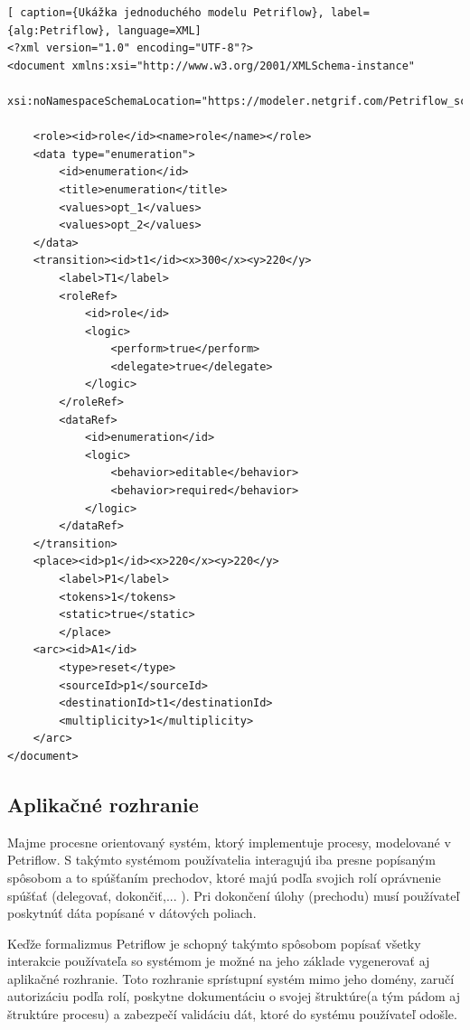 \begin{lstlisting}[ caption={Ukážka jednoduchého modelu Petriflow}, label={alg:Petriflow}, language=XML]
<?xml version="1.0" encoding="UTF-8"?>
<document xmlns:xsi="http://www.w3.org/2001/XMLSchema-instance"
          xsi:noNamespaceSchemaLocation="https://modeler.netgrif.com/Petriflow_schema.xsd">
          
    <role><id>role</id><name>role</name></role>
    <data type="enumeration"> 
        <id>enumeration</id>
        <title>enumeration</title>
        <values>opt_1</values>
        <values>opt_2</values>
    </data>
    <transition><id>t1</id><x>300</x><y>220</y>
        <label>T1</label>
        <roleRef>
            <id>role</id>
            <logic>
                <perform>true</perform>
                <delegate>true</delegate>
            </logic>
        </roleRef>
        <dataRef> 
            <id>enumeration</id>
            <logic>
                <behavior>editable</behavior>
                <behavior>required</behavior>
            </logic>
        </dataRef>
    </transition>
    <place><id>p1</id><x>220</x><y>220</y>
        <label>P1</label>
        <tokens>1</tokens>
        <static>true</static>
        </place>
    <arc><id>A1</id>
        <type>reset</type>
        <sourceId>p1</sourceId>
        <destinationId>t1</destinationId>
        <multiplicity>1</multiplicity>
    </arc>
</document>
\end{lstlisting}






\subsection{Aplikačné rozhranie}

Majme procesne orientovaný systém, ktorý implementuje procesy, modelované v Petriflow. S takýmto systémom používatelia interagujú iba presne popísaným spôsobom a to spúšťaním prechodov, ktoré majú podľa svojich rolí oprávnenie spúšťať (delegovať, dokončiť,... ). Pri dokončení úlohy (prechodu) musí používateľ poskytnúť dáta popísané v dátových poliach.

Keďže formalizmus Petriflow je schopný takýmto spôsobom popísať všetky interakcie používateľa so systémom je možné na jeho základe vygenerovať aj aplikačné rozhranie. Toto rozhranie sprístupní systém mimo jeho domény, zaručí autorizáciu podľa rolí, poskytne dokumentáciu o svojej štruktúre(a tým pádom aj štruktúre procesu) a zabezpečí validáciu dát, ktoré do systému používateľ odošle.

